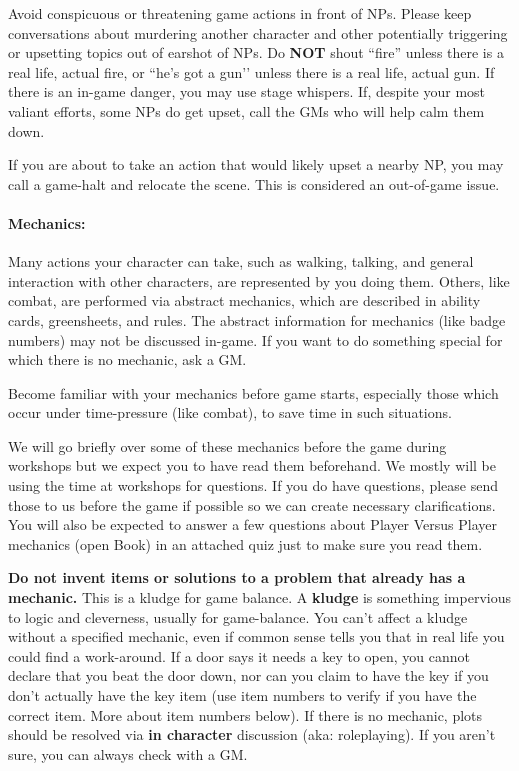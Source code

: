 \documentclass[sheet]{GL2020}
\begin{document}
Avoid conspicuous or threatening game actions in front of NPs. Please keep conversations about murdering another character and other potentially triggering or upsetting topics out of earshot of NPs. Do \textbf{NOT} shout ``fire'' unless there is a real life, actual fire, or ``he’s got a gun’’ unless there is a real life, actual gun. If there is an in-game danger, you may use stage whispers. If, despite your most valiant efforts, some NPs do get upset, call the GMs who will help calm them down.

If you are about to take an action that would likely upset a nearby NP, you may call a game-halt and relocate the scene. This is considered an out-of-game issue.

\paragraph{Mechanics:} Many actions your character can take, such as walking, talking, and general interaction with other characters, are represented by you doing them.  Others, like combat, are performed via abstract mechanics, which are described in ability cards, greensheets, and rules.  The abstract information for mechanics (like badge numbers) may not be discussed in-game.  If you want to do something special for which there is no mechanic, ask a GM.

Become familiar with your mechanics before game starts, especially those which occur under time-pressure (like combat), to save time in such situations.

We will go briefly over some of these mechanics before the game during workshops but we expect you to have read them beforehand.  We mostly will be using the time at workshops for questions.  If you do have questions, please send those to us before the game if possible so we can create necessary clarifications. You will also be expected to answer a few questions about Player Versus Player mechanics (open Book) in an attached quiz just to make sure you read them.

\textbf{Do not invent items or solutions to a problem that already has a mechanic.} This is a kludge for game balance. A \textbf{kludge} is something impervious to logic and cleverness, usually for game-balance.  You can't affect a kludge without a specified mechanic, even if common sense tells you that in real life you could find a work-around. If a door says it needs a key to open, you cannot declare that you beat the door down, nor can you claim to have the key if you don't actually have the key item (use item numbers to verify if you have the correct item. More about item numbers below).  If there is no mechanic, plots should be resolved via \textbf{in character} discussion (aka: roleplaying). If you aren't sure, you can always check with a GM. 
\end{document}
